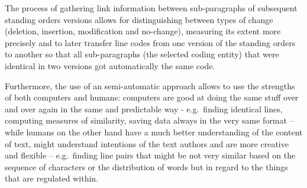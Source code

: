 \documentclass[10pt,]{article}
\newenvironment{Shaded}{\begin{snugshade}}{\end{snugshade}}
\newcommand{\KeywordTok}[1]{\textcolor[rgb]{0.13,0.29,0.53}{\textbf{{#1}}}}
\newcommand{\DataTypeTok}[1]{\textcolor[rgb]{0.13,0.29,0.53}{{#1}}}
\newcommand{\CharTok}[1]{\textcolor[rgb]{0.31,0.60,0.02}{{#1}}}
\newcommand{\StringTok}[1]{\textcolor[rgb]{0.31,0.60,0.02}{{#1}}}
\newcommand{\CommentTok}[1]{\textcolor[rgb]{0.56,0.35,0.01}{\textit{{#1}}}}
\newcommand{\NormalTok}[1]{{#1}}
\begin{document}
The process of gathering link information between sub-paragraphs of
subsequent standing orders versions allows for distinguishing between
types of change (deletion, insertion, modification and no-change),
measuring its extent more precisely and to later transfer line codes
from one version of the standing orders to another so that all
sub-paragraphs (the selected coding entity) that were identical in two
versions got automatically the same code.

Furthermore, the use of an semi-automatic approach allows to use the
strengths of both computers and humans: computers are good at doing the
same stuff over and over again in the same and predictable way -
e.g.~finding identical lines, computing measures of similarity, saving
data always in the very same format -- while humans on the other hand
have a much better understanding of the content of text, might
understand intentions of the text authors and are more creative and
flexible -- e.g.~finding line pairs that might be not very similar based
on the sequence of characters or the distribution of words but in regard
to the things that are regulated within.

\begin{Shaded}
\end{Shaded}
\end{document}

